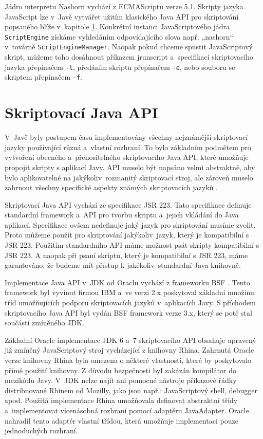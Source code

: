 Jádro interpretu Nashorn vychází z ECMAScriptu verze 5.1. Skripty jazyka JavaScript lze v~Javě vytvářet užitím klasického Java API pro skriptování popsaného blíže v~kapitole \ref{Chapter.JavaScriptInJavaAnalysis.ScriptingJavaAPI}. Konkrétní instanci JavaScriptového jádra \texttt{ScriptEngine} získáme vyhledáním odpovídajícího slova např. „nashorn“ v~továrně \texttt{ScriptEngineManager}. Naopak pokud chceme spustit JavaScriptový skript, můžeme toho dosáhnout příkazem jrunscript a~specifikací skriptovacího jazyka přepínačem \texttt{-l}, předáním skriptu přepínačem \texttt{-e}, nebo souboru se skriptem přepínačem \texttt{-f}.

\section{Skriptovací Java API}
\label{Chapter.JavaScriptInJavaAnalysis.ScriptingJavaAPI}

V~Javě byly postupem času implementovány všechny nejznámější skriptovací jazyky používající různá a~vlastní rozhraní. To bylo základním podmětem pro vytvoření obecného a~přenositelného skriptovacího Java API, které umožňuje propojit skripty s aplikací Javy. API muselo být napsáno velmi abstraktně, aby bylo aplikovatelné na jakýkoliv~rozmanitý skriptovací stroj, ale zároveň muselo zahrnout všechny specifické aspekty známých skriptovacích jazyků \cite{Bibliography.JavaAPI.Script.Book}.

Skriptovací Java API vychází ze specifikace JSR 223. Tato specifikace definuje standardní framework a~API pro tvorbu skriptu a~jejich vkládání do Java aplikací. Specifikace ovšem nedefinuje jaký jazyk pro skriptování musíme zvolit. Proto můžeme použít pro skriptování jakýkoliv~jazyk, který je kompatibilní s JSR 223. Použitím standardního API máme možnost psát skripty kompatibilní s JSR 223. A naopak při psaní skriptu, který je kompatibilní s JSR 223, máme garantováno, že budeme mít přístup k jakékoliv~standardní Java knihovně.

Implementace Java API v~JDK od Oraclu vychází z frameworku BSF \cite{Bibliography.BSF.Framework}. Tento framework byl vyvinut firmou IBM a~ve verzi 2.x poskytoval základní množinu tříd umožňujících podporu skriptovacích jazyků v~aplikacích Javy. S příchodem skriptovacího Java API byl vydán BSF framework verze 3.x, který se poté stal součástí zmíněného JDK.

Základní Oracle implementace JDK 6 a~7 skriptovacího API obsahuje upravený již zmíněný JavaScriptový stroj vycházející z knihovny Rhina. Zahrnutá Oracle verze knihovny Rhina byla omezena o některé vlastnosti, které by poskytovalo přímé použití knihovny. Z důvodu bezpečnosti byl zakázán kompilátor do mezikódu Javy. V~JDK nelze najít ani pomocné nástroje příkazové řádky distribuované Rhinem od Mozilly, jako jsou např.: JavaScriptový shell, debugger apod. Použitá implementace Rhina umožňovala definovat abstraktní třídy a~implementovat vícenásobná rozhraní pomocí adaptéru JavaAdapter. Oracle nahradil tento adaptér vlastní třídou, která umožňuje implementaci pouze jednoduchých rozhraní. 

